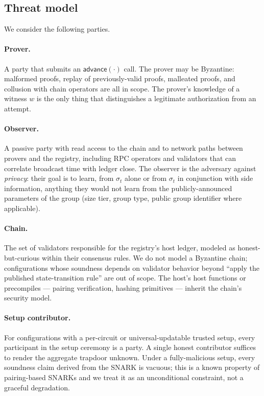 \subsection{Threat model}

We consider the following parties.

\paragraph{Prover.} A party that submits an
$\mathsf{advance}(\cdot)$ call. The prover may be Byzantine: malformed
proofs, replay of previously-valid proofs, malleated proofs, and
collusion with chain operators are all in scope. The prover's
knowledge of a witness $w$ is the only thing that distinguishes a
legitimate authorization from an attempt.

\paragraph{Observer.} A passive party with read access to the chain
and to network paths between provers and the registry, including RPC
operators and validators that can correlate broadcast time with
ledger close. The observer is the adversary against \emph{privacy}:
their goal is to learn, from $\sigma_t$ alone or from $\sigma_t$ in
conjunction with side information, anything they would not learn from
the publicly-announced parameters of the group (size tier, group
type, public group identifier where applicable).

\paragraph{Chain.} The set of validators responsible for the registry's
host ledger, modeled as honest-but-curious within their consensus
rules. We do not model a Byzantine chain; configurations whose
soundness depends on validator behavior beyond ``apply the published
state-transition rule'' are out of scope. The host's host functions
or precompiles --- pairing verification, hashing primitives ---
inherit the chain's security model.

\paragraph{Setup contributor.} For configurations with a per-circuit
or universal-updatable trusted setup, every participant in the setup
ceremony is a party. A single honest contributor suffices to render
the aggregate trapdoor unknown. Under a fully-malicious setup, every
soundness claim derived from the SNARK is vacuous; this is a known
property of pairing-based SNARKs and we treat it as an unconditional
constraint, not a graceful degradation.


